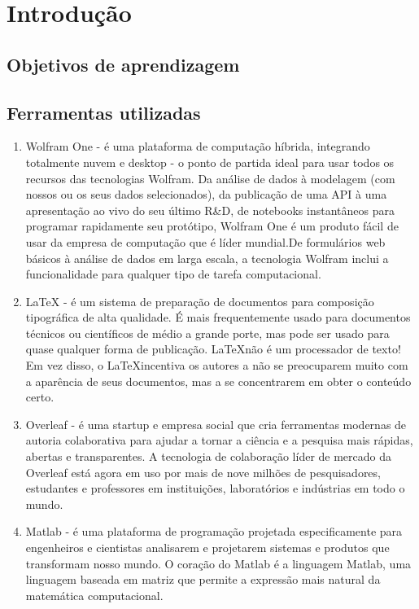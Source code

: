 

\section {Introdução}
\subsection{Objetivos de aprendizagem}
\noindent
\subsection{Ferramentas utilizadas}
\begin{enumerate}[ {(}1{)} ]
\item Wolfram One \cite{wolfram}  - é uma plataforma de computação híbrida, integrando totalmente nuvem e desktop - o ponto de partida ideal para usar todos os recursos das tecnologias Wolfram.
\newline Da análise de dados à modelagem (com nossos ou os seus dados selecionados), da publicação de uma API à uma apresentação ao vivo do seu último R\&D, de notebooks instantâneos para programar rapidamente seu protótipo, Wolfram One é um produto fácil de usar da empresa de computação que é líder mundial.\newline De formulários web básicos à análise de dados em larga escala, a tecnologia Wolfram inclui a funcionalidade para qualquer tipo de tarefa computacional.
\item \LaTeX \cite{latex}   - é um sistema de preparação de documentos para composição tipográfica de alta qualidade. É mais frequentemente usado para documentos técnicos ou científicos de médio a grande porte, mas pode ser usado para quase qualquer forma de publicação.\newline
\LaTeX não é um processador de texto! Em vez disso, o \LaTeX incentiva os autores a não se preocuparem muito com a aparência de seus documentos, mas a se concentrarem em obter o conteúdo certo.
\item Overleaf \cite{overleaf} - é uma startup e empresa social que cria ferramentas modernas de autoria colaborativa para ajudar a tornar a ciência e a pesquisa mais rápidas, abertas e transparentes.\newline
A tecnologia de colaboração líder de mercado da Overleaf está agora em uso por mais de nove milhões de pesquisadores, estudantes e professores em instituições, laboratórios e indústrias em todo o mundo.
\item Matlab \cite{matlab} - é uma plataforma de programação projetada especificamente para engenheiros e cientistas analisarem e projetarem sistemas e produtos que transformam nosso mundo. O coração do Matlab é a linguagem Matlab, uma linguagem baseada em matriz que permite a expressão mais natural da matemática computacional.
\end{enumerate}